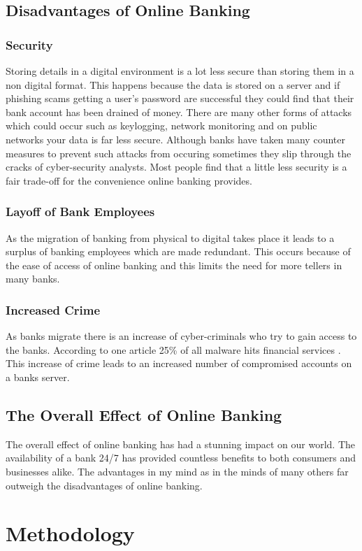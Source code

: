 \section{Disadvantages of Online Banking}
\subsection{Security}
Storing details in a digital environment is a lot less secure than storing them
in a non digital format.  This happens because the data is stored on a server
and if phishing scams getting a user's password are successful they could find that
their bank account has been drained of money.  There are many other forms of attacks
which could occur such as keylogging, network monitoring and on public networks
your data is far less secure.  Although banks have taken many counter measures
to prevent such attacks from occuring sometimes they slip through the cracks of
cyber-security analysts\cite{BankHacks}.  Most people find that a little less security is a fair
trade-off for the convenience online banking provides.
\subsection{Layoff of Bank Employees}
As the migration of banking from physical to digital takes place it leads to
a surplus of banking employees which are made redundant.  This occurs because
of the ease of access of online banking and this limits the need for more
tellers in many banks.
\subsection{Increased Crime}
As banks migrate there is an increase of cyber-criminals who try to gain access
to the banks.  According to one article 25\% of all malware hits financial services
\cite{ForbesBankHack}.  This increase of crime leads to an increased number of compromised
accounts on a banks server.
\section{The Overall Effect of Online Banking}
The overall effect of online banking has had a stunning impact on our world.
The availability of a bank 24/7 has provided countless benefits to both consumers
and businesses alike.  The advantages in my mind as in the minds of many others
far outweigh the disadvantages of online banking.
\chapter{Methodology}
